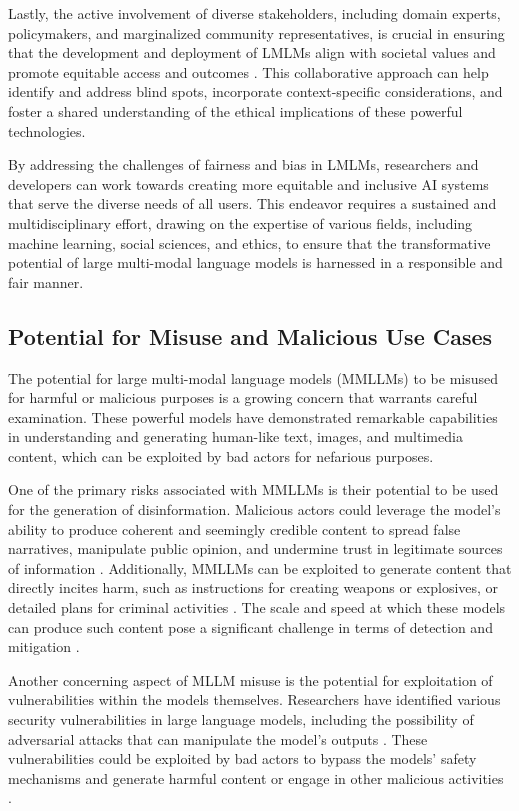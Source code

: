 \documentclass[11pt]{article}
\begin{document}
Lastly, the active involvement of diverse stakeholders, including domain experts, policymakers, and marginalized community representatives, is crucial in ensuring that the development and deployment of LMLMs align with societal values and promote equitable access and outcomes \cite{ref261}. This collaborative approach can help identify and address blind spots, incorporate context-specific considerations, and foster a shared understanding of the ethical implications of these powerful technologies.

By addressing the challenges of fairness and bias in LMLMs, researchers and developers can work towards creating more equitable and inclusive AI systems that serve the diverse needs of all users. This endeavor requires a sustained and multidisciplinary effort, drawing on the expertise of various fields, including machine learning, social sciences, and ethics, to ensure that the transformative potential of large multi-modal language models is harnessed in a responsible and fair manner.

\subsection{Potential for Misuse and Malicious Use Cases}

The potential for large multi-modal language models (MMLLMs) to be misused for harmful or malicious purposes is a growing concern that warrants careful examination. These powerful models have demonstrated remarkable capabilities in understanding and generating human-like text, images, and multimedia content, which can be exploited by bad actors for nefarious purposes.

One of the primary risks associated with MMLLMs is their potential to be used for the generation of disinformation. Malicious actors could leverage the model's ability to produce coherent and seemingly credible content to spread false narratives, manipulate public opinion, and undermine trust in legitimate sources of information \cite{ref262,ref263,ref264}. Additionally, MMLLMs can be exploited to generate content that directly incites harm, such as instructions for creating weapons or explosives, or detailed plans for criminal activities \cite{ref265}. The scale and speed at which these models can produce such content pose a significant challenge in terms of detection and mitigation \cite{ref266}.

Another concerning aspect of MLLM misuse is the potential for exploitation of vulnerabilities within the models themselves. Researchers have identified various security vulnerabilities in large language models, including the possibility of adversarial attacks that can manipulate the model's outputs \cite{ref267,ref268}. These vulnerabilities could be exploited by bad actors to bypass the models' safety mechanisms and generate harmful content or engage in other malicious activities \cite{ref269}.
\end{document}

